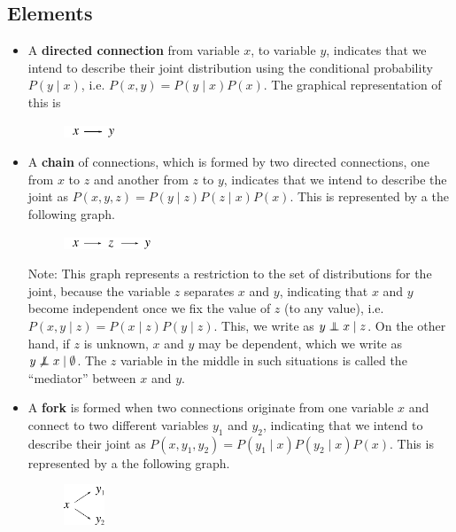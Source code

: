 \subsection{Elements}
\begin{itemize}
	\item A {\bf directed connection} from variable $x$, to variable $y$, indicates that we intend to describe their joint distribution using the conditional probability $P(y\;|\;x)$, i.e. $P(x, y) = P(y\;|\;x) P(x)$. The graphical representation of this is
	\begin{figure}[h]
	\centering
		\includegraphics[height=3.4mm]{./figs/04-xy.pdf} 
	\end{figure}

	\item A {\bf chain} of connections, which is formed by two directed connections, one from $x$ to $z$ and another from $z$ to $y$, indicates that we intend to describe the joint as $P(x, y, z) = P(y\;|\;z) P(z\;|\;x) P(x)$. This is represented by a the following graph.
	\begin{figure}[h]
	\centering
		\includegraphics[height=3.4mm]{./figs/04-xzy.pdf} 
	\end{figure}

	Note: This graph represents a restriction to the set of distributions for the joint, because the variable $z$ separates $x$ and $y$, indicating that $x$ and $y$ become independent once we fix the value of $z$ (to any value), i.e. $P(x,y\;|\;z) = P(x\;|\;z) P(y\;|\;z)$. This, we write as $y \independent x \;|\;z$. On the other hand, if $z$ is unknown, $x$ and $y$ may be dependent, which we write as $y \not\independent x\; | \; \emptyset$. The $z$ variable in the middle in such situations is called the ``mediator'' between $x$ and $y$.

	\item A {\bf fork} is formed when two connections originate from one variable $x$ and connect to two different variables $y_1$ and $y_2$, indicating that we intend to describe their joint as $P(x, y_1, y_2) = P(y_1\;|\;x) P(y_2\;|\;x) P(x)$. This is represented by a the following graph.
	\begin{figure}[h]
	\centering
		\includegraphics[height=12mm]{./figs/04-xy1y2.pdf} 
	\end{figure}


\end{itemize}
